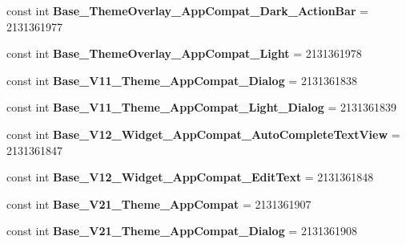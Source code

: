 \begin{DoxyCompactItemize}
const int {\bfseries Base\+\_\+\+Theme\+Overlay\+\_\+\+App\+Compat\+\_\+\+Dark\+\_\+\+Action\+Bar} = 2131361977
\item 
\mbox{\label{class_pinned_app_1_1_droid_1_1_resource_1_1_style_ab5e83b33916b7cf8a36126610d0690d8}} 
const int {\bfseries Base\+\_\+\+Theme\+Overlay\+\_\+\+App\+Compat\+\_\+\+Light} = 2131361978
\item 
\mbox{\label{class_pinned_app_1_1_droid_1_1_resource_1_1_style_ac7e9f759719848b09c77fb404b9304cb}} 
const int {\bfseries Base\+\_\+\+V11\+\_\+\+Theme\+\_\+\+App\+Compat\+\_\+\+Dialog} = 2131361838
\item 
\mbox{\label{class_pinned_app_1_1_droid_1_1_resource_1_1_style_a731992bd77d588b5011d67de4be2f031}} 
const int {\bfseries Base\+\_\+\+V11\+\_\+\+Theme\+\_\+\+App\+Compat\+\_\+\+Light\+\_\+\+Dialog} = 2131361839
\item 
\mbox{\label{class_pinned_app_1_1_droid_1_1_resource_1_1_style_a7678086f7b3c1209234e4748ddb68412}} 
const int {\bfseries Base\+\_\+\+V12\+\_\+\+Widget\+\_\+\+App\+Compat\+\_\+\+Auto\+Complete\+Text\+View} = 2131361847
\item 
\mbox{\label{class_pinned_app_1_1_droid_1_1_resource_1_1_style_a3c21a712847f7282627a9cbe65612590}} 
const int {\bfseries Base\+\_\+\+V12\+\_\+\+Widget\+\_\+\+App\+Compat\+\_\+\+Edit\+Text} = 2131361848
\item 
\mbox{\label{class_pinned_app_1_1_droid_1_1_resource_1_1_style_ad1f14530857cc6e05faf1653341f8596}} 
const int {\bfseries Base\+\_\+\+V21\+\_\+\+Theme\+\_\+\+App\+Compat} = 2131361907
\item 
\mbox{\label{class_pinned_app_1_1_droid_1_1_resource_1_1_style_ae857e642df3a314fab5b41890f90b9ef}} 
const int {\bfseries Base\+\_\+\+V21\+\_\+\+Theme\+\_\+\+App\+Compat\+\_\+\+Dialog} = 2131361908
\item 
\mbox{\label{class_pinned_app_1_1_droid_1_1_resource_1_1_style_a1aa493359b9371eecd5534fb9c1939b5}} 

\end{DoxyCompactItemize}
